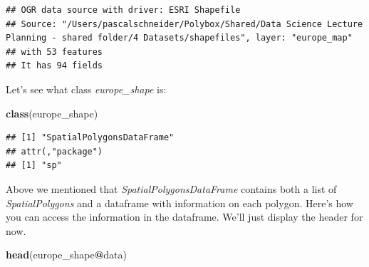 \documentclass[
]{book}
\newenvironment{Shaded}{\begin{snugshade}}{\end{snugshade}}
\newcommand{\KeywordTok}[1]{\textcolor[rgb]{0.13,0.29,0.53}{\textbf{#1}}}
\newcommand{\NormalTok}[1]{#1}
\newcommand{\OperatorTok}[1]{\textcolor[rgb]{0.81,0.36,0.00}{\textbf{#1}}}
\begin{document}
\begin{verbatim}
## OGR data source with driver: ESRI Shapefile 
## Source: "/Users/pascalschneider/Polybox/Shared/Data Science Lecture Planning - shared folder/4 Datasets/shapefiles", layer: "europe_map"
## with 53 features
## It has 94 fields
\end{verbatim}

Let's see what class \emph{europe\_shape} is:

\begin{Shaded}
\begin{Highlighting}[]
\KeywordTok{class}\NormalTok{(europe_shape)}
\end{Highlighting}
\end{Shaded}

\begin{verbatim}
## [1] "SpatialPolygonsDataFrame"
## attr(,"package")
## [1] "sp"
\end{verbatim}

Above we mentioned that \emph{SpatialPolygonsDataFrame} contains both a list of \emph{SpatialPolygons} and a dataframe with information on each polygon. Here's how you can access the information in the dataframe. We'll just display the header for now.

\begin{Shaded}
\begin{Highlighting}[]
\KeywordTok{head}\NormalTok{(europe_shape}\OperatorTok{@}\NormalTok{data)}
\end{Highlighting}
\end{Shaded}
\end{document}

